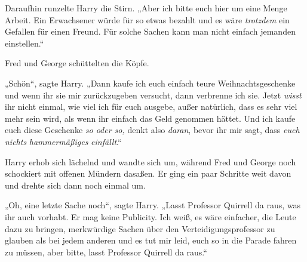 Daraufhin runzelte Harry die Stirn. „Aber ich bitte euch hier um eine Menge Arbeit. Ein Erwachsener würde für so etwas bezahlt und es wäre \emph{trotzdem} ein Gefallen für einen Freund. Für solche Sachen kann man nicht einfach jemanden einstellen.“

Fred und George schüttelten die Köpfe.

„Schön“, sagte Harry. „Dann kaufe ich euch einfach teure Weihnachtsgeschenke und wenn ihr sie mir zurückzugeben versucht, dann verbrenne ich sie. Jetzt \emph{wisst} ihr nicht einmal, wie viel ich für euch ausgebe, außer natürlich, dass es sehr viel mehr sein wird, als wenn ihr einfach das Geld genommen hättet. Und ich kaufe euch diese Geschenke \emph{so oder so,} denkt also \emph{daran}, bevor ihr mir sagt, dass \emph{euch nichts} \emph{hammermäßiges} \emph{einfällt}.“%

Harry erhob sich lächelnd und wandte sich um, während Fred und George noch schockiert mit offenen Mündern dasaßen. Er ging ein paar Schritte weit davon und drehte sich dann noch einmal um.

„Oh, eine letzte Sache noch“, sagte Harry. „Lasst Professor Quirrell da raus, was ihr auch vorhabt. Er mag keine Publicity. Ich weiß, es wäre einfacher, die Leute dazu zu bringen, merkwürdige Sachen über den Verteidigungsprofessor zu glauben als bei jedem anderen und es tut mir leid, euch so in die Parade fahren zu müssen, aber bitte, lasst Professor Quirrell da raus.“

